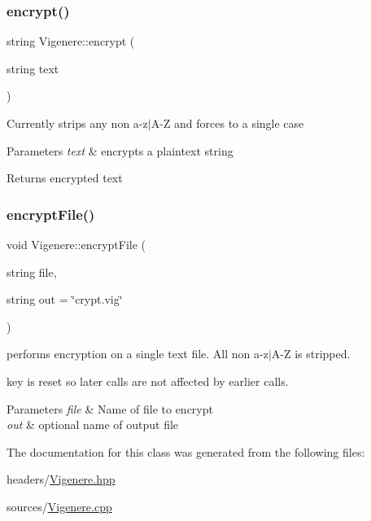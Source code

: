 \subsubsection{\texorpdfstring{encrypt()}{encrypt()}}
{\footnotesize\ttfamily string Vigenere\+::encrypt (\begin{DoxyParamCaption}\item[{string}]{text }\end{DoxyParamCaption})}

Currently strips any non a-\/z$\vert$\+A-\/Z and forces to a single case


\begin{DoxyParams}{Parameters}
{\em text} & encrypts a plaintext string \\
\hline
\end{DoxyParams}
\begin{DoxyReturn}{Returns}
encrypted text 
\end{DoxyReturn}
\mbox{\label{classVigenere_ac0ee004df7b389284c9aaa90c7dbcf76}} 
\subsubsection{\texorpdfstring{encrypt\+File()}{encryptFile()}}
{\footnotesize\ttfamily void Vigenere\+::encrypt\+File (\begin{DoxyParamCaption}\item[{string}]{file,  }\item[{string}]{out = {\ttfamily \char`\"{}crypt.vig\char`\"{}} }\end{DoxyParamCaption})}

performs encryption on a single text file. All non a-\/z$\vert$\+A-\/Z is stripped.

key is reset so later calls are not affected by earlier calls.


\begin{DoxyParams}{Parameters}
{\em file} & Name of file to encrypt \\
\hline
{\em out} & optional name of output file \\
\hline
\end{DoxyParams}


The documentation for this class was generated from the following files\+:\begin{DoxyCompactItemize}
\item 
headers/\hyperlink{Vigenere_8hpp}{Vigenere.\+hpp}\item 
sources/\hyperlink{Vigenere_8cpp}{Vigenere.\+cpp}\end{DoxyCompactItemize}
